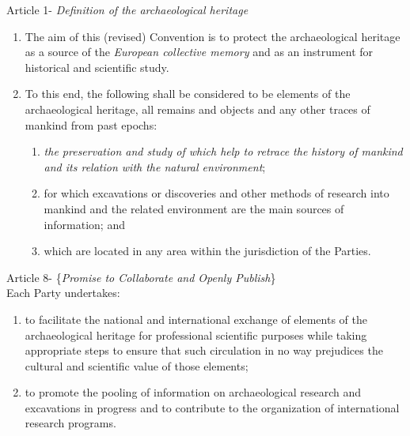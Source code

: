 \begin{displayquote}
	Article 1- \textit{Definition of the archaeological heritage}
	\begin{enumerate}
		\item The aim of this (revised) Convention is to protect the archaeological heritage as a source of the \textit{European collective memory} and as an instrument for historical and scientific study.
		\item To this end, {the following} shall be considered to be elements of the archaeological heritage, all remains and objects and any other traces of mankind from past epochs:
		\begin{enumerate}
			\item \textit{the preservation and study of which help to retrace the history of mankind and its relation with the natural environment};
			\item for which excavations or discoveries and other methods of research into mankind and the related environment are the main sources of information; and
			\item which are located in any area within the jurisdiction of the Parties. %
		\end{enumerate}
	\end{enumerate}
	Article 8- \{\textit{Promise to Collaborate and Openly Publish}\}\\
	Each Party undertakes:
	\begin{enumerate}
		\item to facilitate the national and international exchange of elements of the archaeological heritage for professional scientific purposes while taking appropriate steps to ensure that such circulation in no way prejudices the cultural and scientific value of those elements;
		\item to promote the pooling of information on archaeological research and excavations in progress and to contribute to the organization of international research programs. %
	\end{enumerate}
\end{displayquote}

